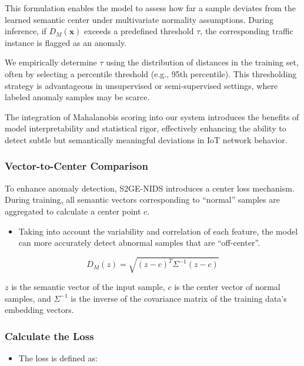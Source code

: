 \begin{ZhChapter}
    This formulation enables the model to assess how far a sample deviates from the learned semantic center under multivariate normality assumptions. During inference, if $D_M(\mathbf{x})$ exceeds a predefined threshold $\tau$, the corresponding traffic instance is flagged as an anomaly.

    We empirically determine $\tau$ using the distribution of distances in the training set, often by selecting a percentile threshold (e.g., 95th percentile). This thresholding strategy is advantageous in unsupervised or semi-supervised settings, where labeled anomaly samples may be scarce.

    The integration of Mahalanobis scoring into our system introduces the benefits of model interpretability and statistical rigor, effectively enhancing the ability to detect subtle but semantically meaningful deviations in IoT network behavior.


    \subsubsection{Vector-to-Center Comparison}
    To enhance anomaly detection, S2GE-NIDS introduces a center loss mechanism. During training, all semantic vectors corresponding to ``normal'' samples are aggregated to calculate a center point $c$.

    \begin{itemize}
        \item Taking into account the variability and correlation of each feature, the model can more accurately detect abnormal samples that are ``off-center''.
    \end{itemize}

    \begin{equation}
        D_M(z) = \sqrt{(z - c)^T \Sigma^{-1} (z - c)}
        \label{eq:mahalanobis}
    \end{equation}

    $z$ is the semantic vector of the input sample, $c$ is the center vector of normal samples, and $\Sigma^{-1}$ is the inverse of the covariance matrix of the training data's embedding vectors.


    \subsubsection{Calculate the Loss}
    \begin{itemize}
        \item The loss is defined as:
    \end{itemize}


\end{ZhChapter}
